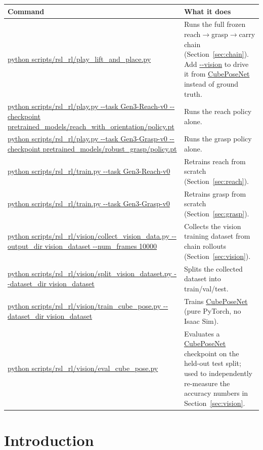 \documentclass[11pt]{article}
\begin{document}
\begin{center}
\renewcommand{\arraystretch}{1.15}
\begin{tabular}{P{5.4cm}P{8.6cm}}
\toprule
Command & What it does \\
\midrule
\url{python scripts/rsl_rl/play_lift_and_place.py} & Runs the full frozen reach$\to$grasp$\to$carry chain (Section~\ref{sec:chain}). Add \url{--vision} to drive it from \url{CubePoseNet} instead of ground truth. \\
\url{python scripts/rsl_rl/play.py --task Gen3-Reach-v0 --checkpoint pretrained_models/reach_with_orientation/policy.pt} & Runs the reach policy alone. \\
\url{python scripts/rsl_rl/play.py --task Gen3-Grasp-v0 --checkpoint pretrained_models/robust_grasp/policy.pt} & Runs the grasp policy alone. \\
\url{python scripts/rsl_rl/train.py --task Gen3-Reach-v0} & Retrains reach from scratch (Section~\ref{sec:reach}). \\
\url{python scripts/rsl_rl/train.py --task Gen3-Grasp-v0} & Retrains grasp from scratch (Section~\ref{sec:grasp}). \\
\url{python scripts/rsl_rl/vision/collect_vision_data.py --output_dir vision_dataset --num_frames 10000} & Collects the vision training dataset from chain rollouts (Section~\ref{sec:vision}). \\
\url{python scripts/rsl_rl/vision/split_vision_dataset.py --dataset_dir vision_dataset} & Splits the collected dataset into train/val/test. \\
\url{python scripts/rsl_rl/vision/train_cube_pose.py --dataset_dir vision_dataset} & Trains \url{CubePoseNet} (pure PyTorch, no Isaac Sim). \\
\url{python scripts/rsl_rl/vision/eval_cube_pose.py} & Evaluates a \url{CubePoseNet} checkpoint on the held-out test split; used to independently re-measure the accuracy numbers in Section~\ref{sec:vision}. \\
\bottomrule
\end{tabular}
\end{center}

\clearpage
\tableofcontents

\section{Introduction}
\label{sec:intro}
\end{document}
